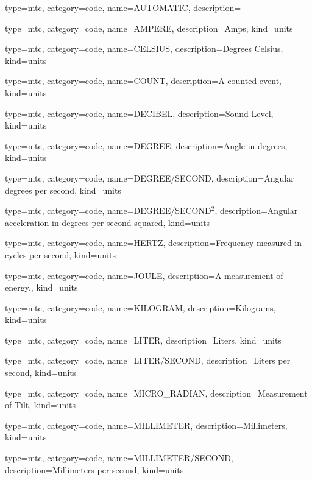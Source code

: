 {
  type=mtc,
  category=code,
  name={AUTOMATIC},
  description={}
}


{
  type=mtc,
  category=code,
  name={AMPERE},
  description={Amps},
  kind={units}
}


{
  type=mtc,
  category=code,
  name={CELSIUS},
  description={Degrees Celsius},
  kind={units}
}


{
  type=mtc,
  category=code,
  name={COUNT},
  description={A counted event},
  kind={units}
}


{
  type=mtc,
  category=code,
  name={DECIBEL},
  description={Sound Level},
  kind={units}
}


{
  type=mtc,
  category=code,
  name={DEGREE},
  description={Angle in degrees},
  kind={units}
}


{
  type=mtc,
  category=code,
  name={DEGREE/SECOND},
  description={Angular degrees per second},
  kind={units}
}


{
  type=mtc,
  category=code,
  name={DEGREE/SECOND$^2$},
  description={Angular acceleration in degrees per second squared},
  kind={units}
}


{
  type=mtc,
  category=code,
  name={HERTZ},
  description={Frequency measured in cycles per second},
  kind={units}
}


{
  type=mtc,
  category=code,
  name={JOULE},
  description={A measurement of energy.},
  kind={units}
}


{
  type=mtc,
  category=code,
  name={KILOGRAM},
  description={Kilograms},
  kind={units}
}


{
  type=mtc,
  category=code,
  name={LITER},
  description={Liters},
  kind={units}
}


{
  type=mtc,
  category=code,
  name={LITER/SECOND},
  description={Liters per second},
  kind={units}
}


{
  type=mtc,
  category=code,
  name={MICRO\_RADIAN},
  description={Measurement of Tilt},
  kind={units}
}


{
  type=mtc,
  category=code,
  name={MILLIMETER},
  description={Millimeters},
  kind={units}
}


{
  type=mtc,
  category=code,
  name={MILLIMETER/SECOND},
  description={Millimeters per second},
  kind={units}
}


